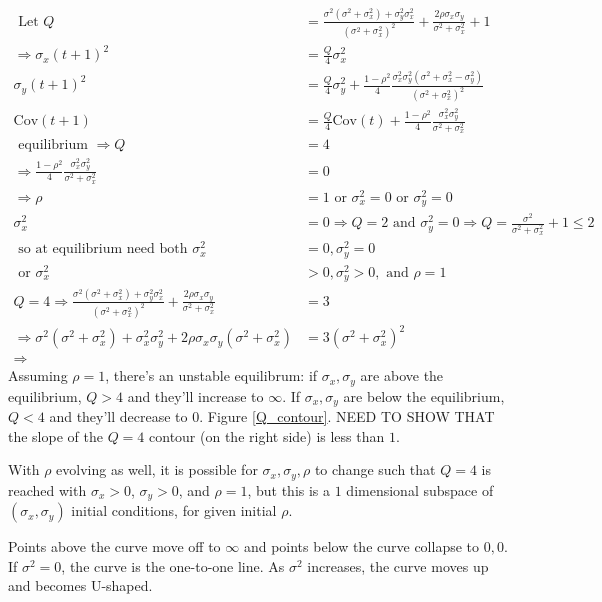 \documentclass{article}
\newcommand{\Cov}{\text{Cov}}
\begin{document}
\begin{align*}
\text{ Let } Q&=\frac{\sigma^2(\sigma^2+\sigma_x^2)+\sigma_y^2\sigma_x^2}{(\sigma^2+\sigma_x^2)^2}+\frac{2\rho\sigma_x\sigma_y}{\sigma^2+\sigma_x^2}+1
\\ \Rightarrow \sigma_x(t+1)^2&=\frac{Q}{4}\sigma_x^2
\\ \sigma_y(t+1)^2&=\frac{Q}{4}\sigma_y^2+\frac{1-\rho^2}{4}\frac{\sigma_x^2\sigma_y^2(\sigma^2+\sigma_x^2-\sigma_y^2)}{(\sigma^2+\sigma_x^2)^2}
\\ \Cov(t+1)&=\frac{Q}{4}\Cov(t) +\frac{1-\rho^2}{4}\frac{\sigma_x^2\sigma_y^2}{\sigma^2+\sigma_x^2}
\\\text{ equilibrium } \Rightarrow Q & = 4 
\\ \Rightarrow \frac{1-\rho^2}{4}\frac{\sigma_x^2\sigma_y^2}{\sigma^2+\sigma_x^2} & = 0
\\ \Rightarrow \rho&=1 \text{ or }  \sigma_x^2=0 \text{ or } \sigma_y^2=0
\\ \sigma_x^2&=0 \Rightarrow Q = 2 \text{ and } \sigma_y^2=0 \Rightarrow Q = \frac{\sigma^2}{\sigma^2+\sigma_x^2}+1\leq 2
\\ \text{ so at equilibrium need both } \sigma_x^2&=0,\sigma_y^2=0 
\\ \text{ or } \sigma_x^2&>0,\sigma_y^2>0, \text{ and } \rho=1
\\ Q = 4 \Rightarrow \frac{\sigma^2(\sigma^2+\sigma_x^2)+\sigma_y^2\sigma_x^2}{(\sigma^2+\sigma_x^2)^2}+\frac{2\rho\sigma_x\sigma_y}{\sigma^2+\sigma_x^2} & = 3
\\ \Rightarrow \sigma^2(\sigma^2+\sigma_x^2)+\sigma_x^2\sigma_y^2+2\rho\sigma_x\sigma_y(\sigma^2+\sigma_x^2) & = 3(\sigma^2+\sigma_x^2)^2
\\ \Rightarrow 
\end{align*}
Assuming $\rho=1$, there's an unstable equilibrum: if $\sigma_x,\sigma_y$ are  above the equilibrium, $Q>4$ and they'll increase to $\infty$. If $\sigma_x,\sigma_y$ are below the equilibrium, $Q<4$ and they'll decrease to $0$. Figure \ref{Q_contour}. NEED TO SHOW THAT the slope of the $Q=4$ contour (on the right side) is less than $1$.

With $\rho$ evolving as well, it is possible for $\sigma_x,\sigma_y,\rho$ to change such that $Q=4$ is reached with $\sigma_x>0$, $\sigma_y>0$, and $\rho=1$, but this is a $1$ dimensional subspace of $(\sigma_x,\sigma_y)$ initial conditions, for given initial $\rho$.

Points above the curve move off to $\infty$ and points below the curve collapse to $0,0$. If $\sigma^2=0$, the curve is the one-to-one line. As $\sigma^2$ increases, the curve moves up and becomes U-shaped.
\end{document}
